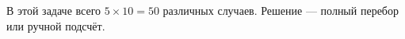 \solutionSection

В этой задаче всего $5 \times 10 = 50$ различных случаев. Решение — полный перебор или ручной подсчёт.

\codeExample

